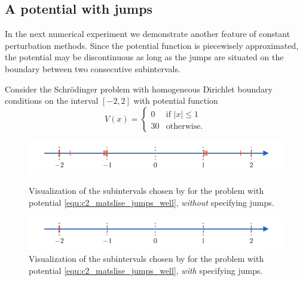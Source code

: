 \subsection{A potential with jumps}

In the next numerical experiment we demonstrate another feature of constant perturbation methods. Since the potential function is piecewisely approximated, the potential may be discontinuous as long as the jumps are situated on the boundary between two consecutive subintervals.

Consider the Schrödinger problem with homogeneous Dirichlet boundary conditions on the interval $[-2, 2]$ with potential function
\begin{equation}\label{equ:c2_matslise_jumps_well}
    V(x) = \begin{cases}
        0  & \text{if $|x| \leq 1$} \\
        30 & \text{otherwise.}
    \end{cases}
\end{equation}

\begin{figure}
    \begin{center}
        \includegraphics[width=\textwidth]{img/chapter2/matslise_jumps_without.pdf}
    \end{center}
    \caption{Visualization of the subintervals chosen by  for the problem with potential \eqref{equ:c2_matslise_jumps_well}, \emph{without} specifying jumps.}
    \label{fig:c2_matslise_jumps_without}
    \vspace{8mm}
    \begin{center}
        \includegraphics[width=\textwidth]{img/chapter2/matslise_jumps_with.pdf}
    \end{center}
    \caption{Visualization of the subintervals chosen by  for the problem with potential \eqref{equ:c2_matslise_jumps_well}, \emph{with} specifying jumps.}
    \label{fig:c2_matslise_jumps_with}
\end{figure}

